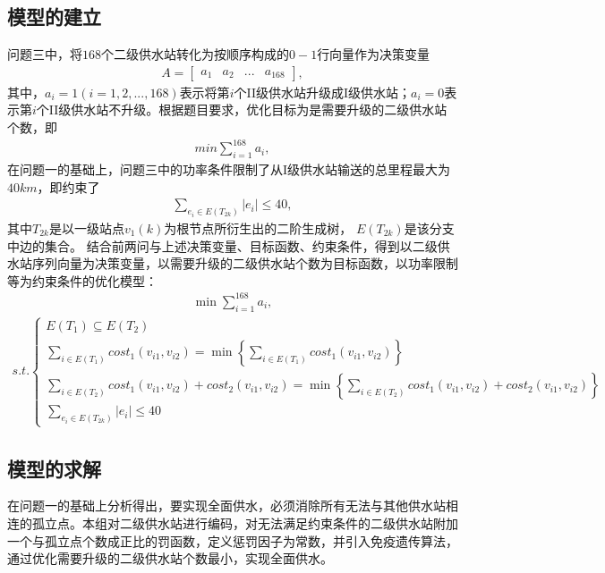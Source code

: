 \documentclass{whutmod}
\begin{document}
    	\subsection{模型的建立}
    	问题三中，将$168$个二级供水站转化为按顺序构成的$0-1$行向量作为决策变量
    	\begin{gather}
    	A=
    	\begin{bmatrix}
    	a_1&a_2&...&a_{168}
    	\end{bmatrix},
    	\end{gather}
    	其中，$a_i=1(i=1,2,...,168)$表示将第$i$个II级供水站升级成I级供水站；$a_i=0$表示第$i$个II级供水站不升级。根据题目要求，优化目标为是需要升级的二级供水站个数，即
    	\begin{gather*}
    	min\sum_{i=1}^{168}a_i,
    	\end{gather*}
    	在问题一的基础上，问题三中的功率条件限制了从I级供水站输送的总里程最大为$40km$，即约束了
    	\begin{gather*}
    	\sum_{e_i\in E(T_{2k})}|e_i|\leq 40,
    	\end{gather*}
    	其中$T_{2k}$是以一级站点$v_1(k)$为根节点所衍生出的二阶生成树， $E(T_{2k})$是该分支中边的集合。 结合前两问与上述决策变量、目标函数、约束条件，得到以二级供水站序列向量为决策变量，以需要升级的二级供水站个数为目标函数，以功率限制等为约束条件的优化模型：
    	\begin{gather}
    	\min \sum_{i=1}^{168}a_i,
    	\end{gather}
    		\begin{gather*}
    	s.t.
    	\left\{\begin{matrix}
    	E(T_{1})\subseteq  E(T_{2})\\ 
    	\sum_{i\in E(T_1) }cost_1(v_{i1},v_{i2})=\min\left \{ 	\sum_{i\in E(T_1) }cost_1(v_{i1},v_{i2}) \right \} \\ 
    	\sum_{i\in E(T_2) }cost_1(v_{i1},v_{i2})+cost_2(v_{i1},v_{i2}) =\min \left\{ \sum_{i\in E(T_2) }cost_1(v_{i1},v_{i2})+cost_2(v_{i1},v_{i2}) \right \}	\\
    	\sum_{e_i\in E(T_{2k})}|e_i|\leq 40
    	\end{matrix}\right.
    	\end{gather*}
    	\subsection{模型的求解}
    	在问题一的基础上分析得出，要实现全面供水，必须消除所有无法与其他供水站相连的孤立点。本组对二级供水站进行编码，对无法满足约束条件的二级供水站附加一个与孤立点个数成正比的罚函数，定义惩罚因子为常数，并引入免疫遗传算法，通过优化需要升级的二级供水站个数最小，实现全面供水。
\end{document}
